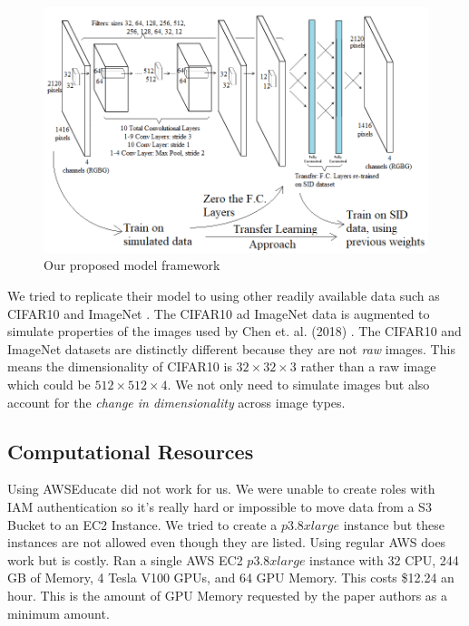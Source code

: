 \documentclass{article}
\begin{document}
\begin{figure}[ht]
  \centering
  \includegraphics[scale=0.5]{model.png}
  \caption{Our proposed model framework}
\end{figure}

We tried to replicate their model to using other readily
available data such as CIFAR10 \cite{cifar10} and ImageNet
\cite{imagenet_cvpr09}. The CIFAR10 ad ImageNet data is augmented to
simulate properties of the images used by Chen et. al. (2018)
\cite{chen2018learning}. The CIFAR10 and ImageNet datasets are distinctly
different because they are not \textit{raw} images. This means the
dimensionality of CIFAR10 is $32 \times 32 \times 3$ rather than a raw
image which could be $512 \times 512 \times 4$. We not only need to
simulate images but also account for the \textit{change in dimensionality}
across image types.



\subsection{Computational Resources}

Using AWSEducate did not work for us. We were unable to create roles with
IAM authentication so it's really hard or impossible to move data from a
S3 Bucket to an EC2 Instance. We tried to create a $p3.8xlarge$ instance but
these instances are not allowed even though they are listed. Using regular
AWS does work but is costly. Ran a single AWS EC2 $p3.8xlarge$ instance
with 32 CPU, 244 GB of Memory, 4 Tesla V100 GPUs, and 64 GPU Memory. This
costs \$12.24 an hour. This is the amount of GPU Memory requested by the
paper authors as a minimum amount. \newline
\end{document}
